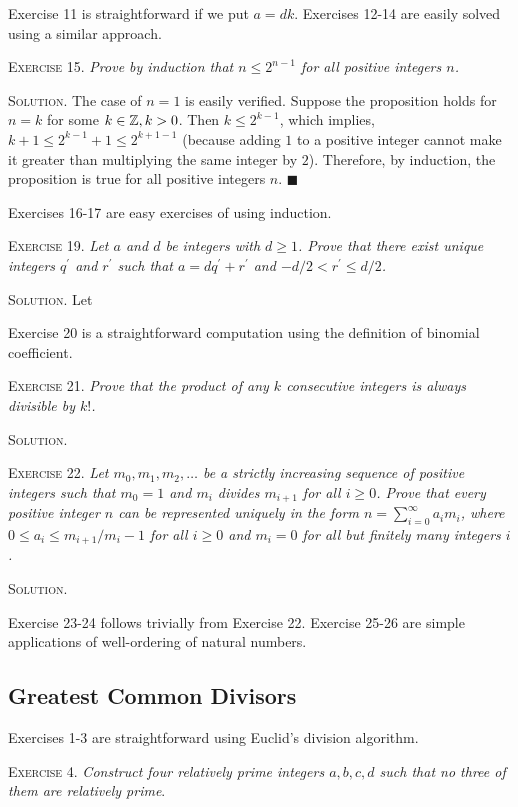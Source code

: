 \documentclass[11pt, leqno]{article}
\newcommand{\done}{\ensuremath{\blacksquare}}
\begin{document}
Exercise 11 is straightforward if we put $a=dk$. Exercises 12-14 are easily solved using a similar approach. 

\textsc{Exercise 15}. \emph{Prove by induction that $n\leq 2^{n-1}$ for all positive integers $n$.}

\textsc{Solution}. The case of $n=1$ is easily verified. Suppose the proposition holds for $n=k$ for some $k\in\mathbb{Z}, k>0$. Then $k \leq 2^{k-1}$, which implies, $k+1 \leq 2^{k-1}+1 \leq 2^{k+1-1}$ (because adding $1$ to a positive integer cannot make it greater than multiplying the same integer by $2$). Therefore, by induction, the proposition is true for all positive integers $n$. \done

Exercises 16-17 are easy exercises of using induction.

\textsc{Exercise 19}. \emph{Let $a$ and $d$ be integers with $d\geq 1$. Prove that there exist unique integers $q^{\prime}$ and $r^{\prime}$ such that $a=dq^{\prime} + r^{\prime}$ and $-d/2 < r^{\prime} \leq d/2$.}

\textsc{Solution}. Let

Exercise 20 is a straightforward computation using the definition of binomial coefficient.

\textsc{Exercise 21}. \emph{Prove that the product of any $k$ consecutive integers is always divisible by $k!$.}

\textsc{Solution}.

\textsc{Exercise 22}. \emph{Let $m_0, m_1, m_2,\ldots$ be a strictly increasing sequence of positive integers such that $m_0=1$ and $m_i$ divides $m_{i+1}$ for all $i\geq 0$. Prove that every positive integer $n$ can be represented uniquely in the form $n = \sum_{i=0}^{\infty}a_im_i$, where $0\leq a_i \leq m_{i+1}/m_i-1$ for all $i\geq 0$ and $m_i=0$ for all but finitely many integers $i$.}

\textsc{Solution}. 

Exercise 23-24 follows trivially from Exercise 22. Exercise 25-26 are simple applications of well-ordering of natural numbers. 

\subsection{Greatest Common Divisors}

Exercises 1-3 are straightforward using Euclid's division algorithm.

\textsc{Exercise 4}. \emph{Construct four relatively prime integers $a,b,c,d$ such that no three of them are relatively prime}.
\end{document}
